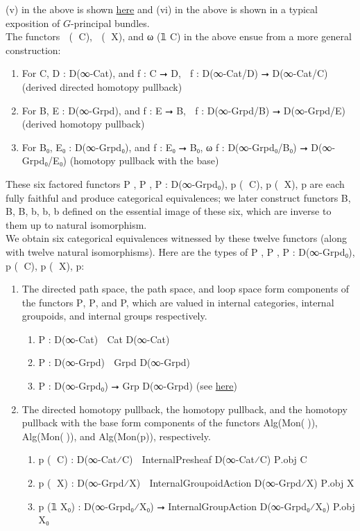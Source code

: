 \documentclass{book}
\theoremstyle{definition}
\begin{document}
(v) in the above is shown \href{https://mathoverflow.net/questions/128883/why-omega-x-and-bg-are-adjoint-functors}{here} and (vi) in the above is shown in a typical exposition of $G$-principal bundles.\\

The functors ω⃗ (𝟙 C), ω⃡ (𝟙 X), and ω (𝟙 C) in the above ensue from a more general construction:\\

\begin{enumerate}
\item For C, D : D(∞-Cat), and f : C ⭢ D, ω⃗ f : D(∞-Cat/D) ⭢ D(∞-Cat/C)   (derived directed homotopy pullback)
\item For B, E : D(∞-Grpd), and f : E ⭢ B, ω⃡ f : D(∞-Grpd/B) ⭢ D(∞-Grpd/E) (derived homotopy pullback)
\item For B₀, E₀ : D(∞-Grpd₀), and f : E₀ ⭢ B₀, ω f : D(∞-Grpd₀/B₀) ⭢ D(∞-Grpd₀/E₀) (homotopy pullback with the base)
\end{enumerate}

These six factored functors P⃗ , P⃡ , P : D(∞-Grpd₀), p⃗ (𝟙 C), p⃡ (𝟙 X), p are each fully faithful and produce categorical equivalences; we later construct functors B⃗, B⃡, B, b⃗, b⃡, b defined on the essential image of these six, which are inverse to them up to natural isomorphism.\\

We obtain six categorical equivalences witnessed by these twelve functors (along with twelve natural isomorphisms). Here are the types of P⃗ , P⃡ , P : D(∞-Grpd₀), p⃗ (𝟙 C), p⃡ (𝟙 X), p:

\begin{enumerate}
\item The directed path space, the path space, and loop space form components of the functors P⃗, P⃡, and P, which are valued in internal categories, internal groupoids, and internal groups respectively.
\begin{enumerate}
\item P⃗ : D(∞-Cat) ⭢ Cat D(∞-Cat)
\item P⃡ : D(∞-Grpd) ⭢ Grpd D(∞-Grpd)
\item P : D(∞-Grpd₀) ⭢ Grp D(∞-Grpd) (see \href{https://mathoverflow.net/questions/128883/why-omega-x-and-bg-are-adjoint-functors}{here})
\end{enumerate}
\item The directed homotopy pullback, the homotopy pullback, and the homotopy pullback with the base form components of the functors Alg(Mon(ω⃗)), Alg(Mon(ω⃡)), and Alg(Mon(p)), respectively. 
\begin{enumerate}
\item p⃗ (𝟙 C) : D(∞-Cat⁄C) ⭢ InternalPresheaf D(∞-Cat⁄C) P⃗.obj C 
\item p⃡ (𝟙 X) : D(∞-Grpd⁄X) ⭢ InternalGroupoidAction D(∞-Grpd⁄X) P⃡.obj X
\item p (𝟙 X₀) : D(∞-Grpd₀⁄X₀) ⭢ InternalGroupAction D(∞-Grpd₀⁄X₀) P.obj X₀
\end{enumerate}
\end{enumerate}
\end{document}
